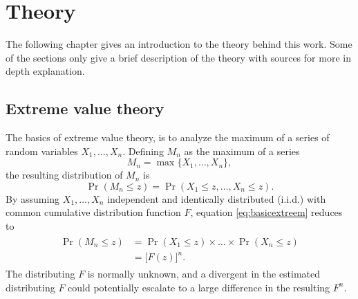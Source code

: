 \chapter[Theory]{Theory}
The following chapter gives an introduction to the theory behind this work. Some of the sections only give a brief description of the theory with sources for more in depth explanation. %
\section{Extreme value theory}
The basics of extreme value theory, is to analyze the maximum of a series of random variables $X_1,\dots,X_n$.
Defining $M_n$ as the maximum of a series
\begin{equation}
M_n=\max\{X_1,\dots,X_n\},
\end{equation}
%
the resulting distribution of $M_n$ is
\begin{equation}
\label{eq:basicextreem}
\Pr(M_n \leq z)=\Pr(X_1 \leq z,\dots, X_n \leq z).
\end{equation}
By assuming $X_1,\dots,X_n$ independent and identically distributed (i.i.d.) with common cumulative distribution function $F$, equation \eqref{eq:basicextreem} reduces to
\begin{align}
\begin{split}
    \Pr(M_n \leq z)&=\Pr(X_1 \leq z)\times \dots \times \Pr(X_n \leq z)\\
    &=\big[F(z)\big]^n.   
\end{split}
\end{align}
The distributing $F$ is normally unknown, and a divergent in the estimated distributing $F$ could potentially escalate to a large difference in the resulting $F^n$. 

